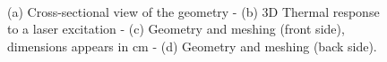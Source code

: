 \begin{figure}
  \centering
	
	
  \hspace*{\fill}
	\hfill
	\hspace*{\fill} \\ \hspace*{\fill}
	\hfill
	\hspace*{\fill}
    
	
		\caption{(a) Cross-sectional view of the geometry - (b) 3D Thermal response to a laser 
	excitation - (c) Geometry and meshing (front side), dimensions appears in cm  - (d) 
	Geometry and meshing (back side).}
  \label{fig:2}
\end{figure}
